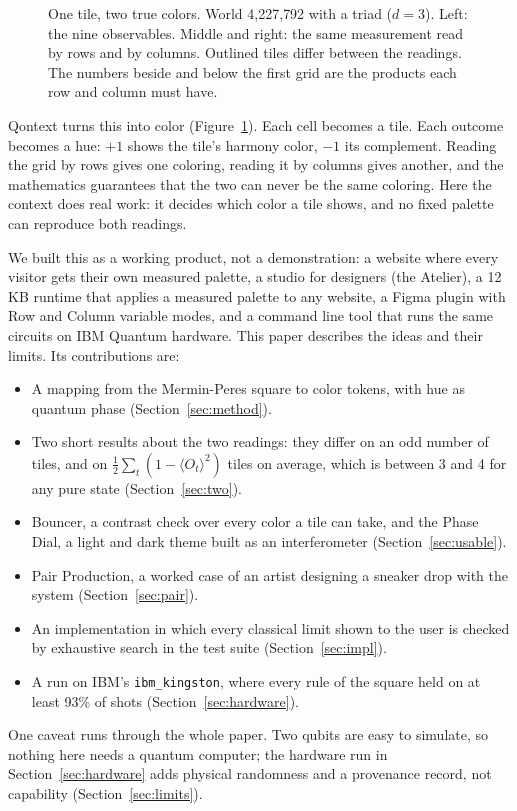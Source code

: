 \documentclass[11pt,a4paper]{article}
\newcommand{\figwidth}{\linewidth}
\newcommand{\expect}[1]{\langle #1\rangle}
\theoremstyle{qresult}
\begin{document}
\begin{figure}[tb]
  \centering
  \resizebox{\figwidth}{!}{}
  \caption{One tile, two true colors. World 4{,}227{,}792 with a triad ($d=3$). Left: the nine observables. Middle and right: the same measurement
  read by rows and by columns. Outlined tiles differ between the readings. The numbers beside and below the first grid
  are the products each row and column must have.}
  \label{fig:grid}
\end{figure}

Qontext turns this into color (Figure~\ref{fig:grid}). Each cell becomes a tile. Each outcome becomes a hue: $+1$ shows the tile's harmony
color, $-1$ its complement. Reading the grid by rows gives one coloring, reading it by columns gives another, and the
mathematics guarantees that the two can never be the same coloring. Here the context does real work: it decides
which color a tile shows, and no fixed palette can reproduce both readings.

We built this as a working product, not a demonstration: a website where every visitor gets their own measured
palette, a studio for designers (the Atelier), a 12\,KB runtime that applies a measured palette to any website, a
Figma plugin with Row and Column variable modes, and a command line tool that runs the same circuits on IBM Quantum
hardware. This paper describes the ideas and their limits. Its contributions are:
\begin{itemize}
  \item A mapping from the Mermin-Peres square to color tokens, with hue as quantum phase (Section~\ref{sec:method}).
  \item Two short results about the two readings: they differ on an odd number of tiles, and on $\tfrac12\sum_t
        (1-\expect{O_t}^2)$ tiles on average, which is between 3 and 4 for any pure state (Section~\ref{sec:two}).
  \item Bouncer, a contrast check over every color a tile can take, and the Phase Dial, a light and dark theme
        built as an interferometer (Section~\ref{sec:usable}).
  \item Pair Production, a worked case of an artist designing a sneaker drop with the system
        (Section~\ref{sec:pair}).
  \item An implementation in which every classical limit shown to the user is checked by exhaustive search in the
        test suite (Section~\ref{sec:impl}).
  \item A run on IBM's \texttt{ibm\_kingston}, where every rule of the square held on at least 93\% of shots
        (Section~\ref{sec:hardware}).
\end{itemize}
One caveat runs through the whole paper. Two qubits are easy to simulate, so nothing here needs a quantum computer;
the hardware run in Section~\ref{sec:hardware} adds physical randomness and a provenance record, not capability
(Section~\ref{sec:limits}).
\end{document}
